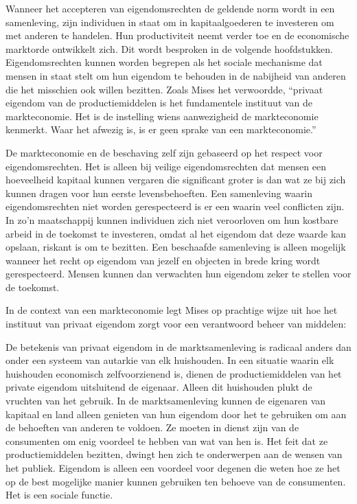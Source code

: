 Wanneer het accepteren van eigendomsrechten de geldende norm wordt in een samenleving, zijn individuen in staat om in kapitaalgoederen te investeren om met anderen te handelen. Hun productiviteit neemt verder toe en de economische marktorde ontwikkelt zich. Dit wordt besproken in de volgende hoofdstukken. Eigendomsrechten kunnen worden begrepen als het sociale mechanisme dat mensen in staat stelt om hun eigendom te behouden in de nabijheid van anderen die het misschien ook willen bezitten. Zoals Mises het verwoordde, \enquote{privaat eigendom van de productiemiddelen is het fundamentele instituut van de markteconomie. Het is de instelling wiens aanwezigheid de markteconomie kenmerkt. Waar het afwezig is, is er geen sprake van een markteconomie.}\autocite{55}

De markteconomie en de beschaving zelf zijn gebaseerd op het respect voor eigendomsrechten. Het is alleen bij veilige eigendomsrechten dat mensen een hoeveelheid kapitaal kunnen vergaren die significant groter is dan wat ze bij zich kunnen dragen voor hun eerste levensbehoeften. Een samenleving waarin eigendomsrechten niet worden gerespecteerd is er een waarin veel conflicten zijn. In zo'n maatschappij kunnen individuen zich niet veroorloven om hun kostbare arbeid in de toekomst te investeren, omdat al het eigendom dat deze waarde kan opslaan, riskant is om te bezitten. Een beschaafde samenleving is alleen mogelijk wanneer het recht op eigendom van jezelf en objecten in brede kring wordt gerespecteerd. Mensen kunnen dan verwachten hun eigendom zeker te stellen voor de toekomst.

In de context van een markteconomie legt Mises op prachtige wijze uit hoe het instituut van privaat eigendom zorgt voor een verantwoord beheer van middelen:

\begin{blockquotebox}
    De betekenis van privaat eigendom in de marktsamenleving is radicaal anders dan onder een systeem van autarkie van elk huishouden. In een situatie waarin elk huishouden economisch zelfvoorzienend is, dienen de productiemiddelen van het private eigendom uitsluitend de eigenaar. Alleen dit huishouden plukt de vruchten van het gebruik. In de marktsamenleving kunnen de eigenaren van kapitaal en land alleen genieten van hun eigendom door het te gebruiken om aan de behoeften van anderen te voldoen. Ze moeten in dienst zijn van de consumenten om enig voordeel te hebben van wat van hen is. Het feit dat ze productiemiddelen bezitten, dwingt hen zich te onderwerpen aan de wensen van het publiek. Eigendom is alleen een voordeel voor degenen die weten hoe ze het op de best mogelijke manier kunnen gebruiken ten behoeve van de consumenten. Het is een sociale functie.\footnotemark
\end{blockquotebox}
\autocite{56}

